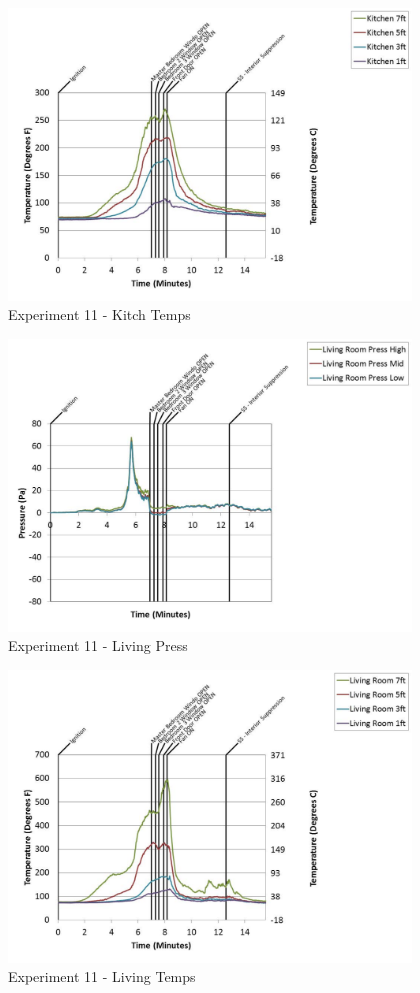 \documentclass{article}
\begin{document}
\begin{appendices}
	\begin{figure}[h!]
		\centering
		\includegraphics[height=3.05in]{0_Images/Results_Charts/Exp_11_Charts/KitchTemps.pdf}
		\caption{Experiment 11 - Kitch Temps}
	\end{figure}
 
	\clearpage

	\begin{figure}[h!]
		\centering
		\includegraphics[height=3.05in]{0_Images/Results_Charts/Exp_11_Charts/LivingPress.pdf}
		\caption{Experiment 11 - Living Press}
	\end{figure}
 

	\begin{figure}[h!]
		\centering
		\includegraphics[height=3.05in]{0_Images/Results_Charts/Exp_11_Charts/LivingTemps.pdf}
		\caption{Experiment 11 - Living Temps}
	\end{figure}
 

\end{appendices}
\end{document}
